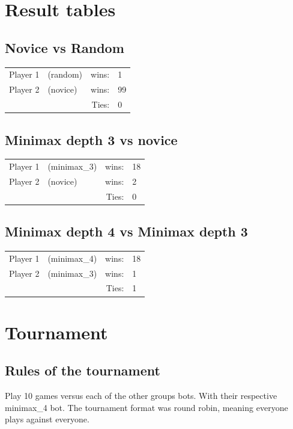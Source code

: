 \documentclass[12pt, a4paper]{article}
\begin{document}
\section{Result tables}

\subsection{Novice vs Random}
  \begin{tabular}{| l  l  r l |}
    \hline
 	Player 1 & (random) & wins: & 1 \\
 	Player 2 & (novice) & wins: & 99 \\
 	& &  Ties: & 0 \\
    \hline
  \end{tabular}



\subsection{Minimax depth 3 vs novice}
  \begin{tabular}{| l  l  r l |}
    \hline
 	Player 1 & (minimax\_3) & wins: & 18 \\
 	Player 2 & (novice) & wins: & 2 \\
 	& &  Ties: & 0 \\
    \hline
  \end{tabular}


\subsection{Minimax depth 4 vs Minimax depth 3}
  \begin{tabular}{| l  l  r l |}
    \hline
 	Player 1 & (minimax\_4) & wins: & 18 \\
 	Player 2 & (minimax\_3) & wins: & 1 \\
 	& &  Ties: & 1 \\
    \hline
  \end{tabular}

\section{Tournament}

\subsection{Rules of the tournament}
Play 10 games versus each of the other groups bots. With their respective minimax\_4 bot. The tournament format was round robin, meaning everyone plays against everyone. 
\end{document}
